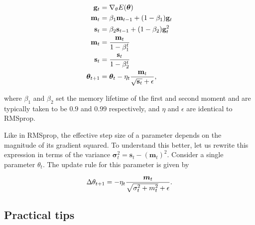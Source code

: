 \documentclass[%
oneside,                 %
final,                   %
10pt]{article}
\begin{document}
\begin{align}
\mathbf{g}_t &= \nabla_\theta E(\boldsymbol{\theta}) \\
\mathbf{m}_t &= \beta_1 \mathbf{m}_{t-1} + (1-\beta_1) \mathbf{g}_t \nonumber \\
\mathbf{s}_t &=\beta_2 \mathbf{s}_{t-1} +(1-\beta_2)\mathbf{g}_t^2 \nonumber \\
\bm{\mathbf{m}}_t&={\mathbf{m}_t \over 1-\beta_1^t} \nonumber \\
\bm{\mathbf{s}}_t &={\mathbf{s}_t \over1-\beta_2^t} \nonumber \\
\boldsymbol{\theta}_{t+1}&=\boldsymbol{\theta}_t - \eta_t { \bm{\mathbf{m}}_t \over \sqrt{\bm{\mathbf{s}}_t} +\epsilon}, \nonumber \\
\end{align}

where $\beta_1$ and $\beta_2$ set the memory lifetime of the first and
second moment and are typically taken to be $0.9$ and $0.99$
respectively, and $\eta$ and $\epsilon$ are identical to RMSprop.

Like in RMSprop, the effective step size of a parameter depends on the
magnitude of its gradient squared.  To understand this better, let us
rewrite this expression in terms of the variance
$\boldsymbol{\sigma}_t^2 = \bm{\mathbf{s}}_t -
(\bm{\mathbf{m}}_t)^2$. Consider a single parameter $\theta_t$. The
update rule for this parameter is given by

\[
\Delta \theta_{t+1}= -\eta_t { \bm{m}_t \over \sqrt{\sigma_t^2 +  m_t^2 }+\epsilon}.
\]




\subsection{Practical tips}
\end{document}
